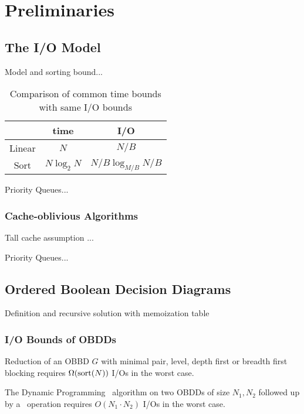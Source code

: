 \section{Preliminaries} \label{sec:preliminaries}

\subsection{The I/O Model}
Model and sorting bound... \cite{Aggarwal87}

\begin{table}[ht!]
  \centering
  
  \begin{tabular}{c|c|c}
           & time         & I/O
    \\ \hline
    Linear & $N$          & $N/B$
    \\
    Sort   & $N \log_2 N$ & $N/B \log_{M/B} N/B$
  \end{tabular}
  
  \caption{Comparison of common time bounds with same I/O bounds}
  \label{tab:time_vs_io}
\end{table}

Priority Queues... \cite{Arge04}

\subsubsection{Cache-oblivious Algorithms}
Tall cache assumption ...

Priority Queues... \cite{Arge07, Sanders2001}

\subsection{Ordered Boolean Decision Diagrams}
Definition and recursive solution with memoization table \cite{Bryant86, Dijk16}

\subsubsection{I/O Bounds of OBDDs}
\begin{theorem} \label{thm:reduce_io_lower_bound}

  Reduction of an OBBD $G$ with minimal pair, level, depth first or breadth
  first blocking requires $\Omega(\text{sort}(N))$ I/Os in the worst case.
\end{theorem}

\begin{theorem} \label{thm:apply_io_worst_case}

  The Dynamic Programming \Apply\ algorithm on two OBDDs of size $N_1, N_2$
  followed up by a \Reduce\ operation requires $O(N_1 \cdot N_2)$ I/Os in the
  worst case.
\end{theorem}




